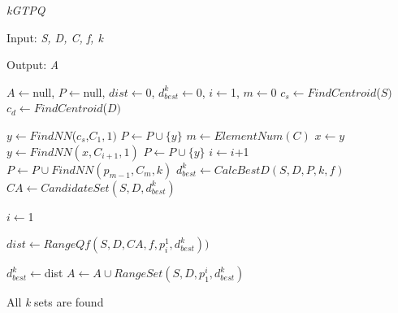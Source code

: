 \begin{algorithm}[!htbp] %
 \caption{\emph{kGTPQ}}
 \label{alg:gtpq}

Input:  \textit{S, D, C, f, k}

Output: \textit{A}

\begin{algorithmic}[1]
\STATE $A \leftarrow $null, $P \leftarrow $null, $dist \leftarrow $0, $d_{best}^k \leftarrow $0, $i \leftarrow $1, $m \leftarrow 0$
\STATE $c_{s} \leftarrow FindCentroid$($S)$
\STATE $c_{d} \leftarrow FindCentroid$($D)$

\STATE $y \leftarrow FindNN$($c_{s}$,$C_{1}, 1)$
\STATE $P \leftarrow P \cup \{y\}$
\STATE $m \leftarrow ElementNum(C)$
	\STATE $x \leftarrow $$y$
	\STATE $y \leftarrow FindNN(x,C_{i+1},1)$
	\STATE $ P \leftarrow P \cup \{y\}$
	\STATE $i \leftarrow i$+1
 \ENDWHILE 	
\STATE $P \leftarrow P \cup FindNN(p_{m-1},C_{m},k)$
\STATE $d_{best}^k \leftarrow CalcBestD(S,D,P,k,f)$
\STATE $CA \leftarrow CandidateSet(S,D,d_{best}^k)$

\STATE $i \leftarrow $1
\REPEAT
{}

\STATE $dist \leftarrow RangeQf(S,D,CA,f,p_{i}^1,d_{best}^k))$


\STATE $d_{best}^k \leftarrow $dist
\STATE $A \leftarrow A \cup RangeSet(S,D,p_1^i,d_{best}^k)$


\ENDIF
\ENDFOR

\UNTIL All \textit{k} sets are found
 \end{algorithmic}
 \end{algorithm}






